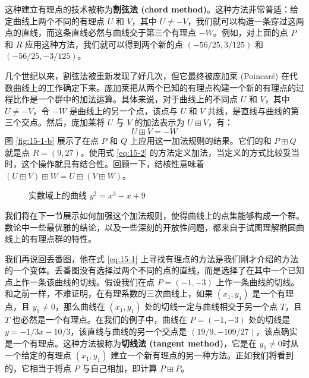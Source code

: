 这种建立有理点的技术被称为\textbf{割弦法 (chord method)}。这种方法非常普适：给定曲线上两个不同的有理点 $U$ 和 $V$，其中 $U\neq-V$，我们就可以构造一条穿过这两点的直线，而这条直线必然与曲线交于第三个有理点 $-W$。例如，对上面的点 $P$ 和 $R$ 应用这种方法，我们就可以得到两个新的点 $(-56/25,3/125)$ 和 $(-56/25,-3/125)$。

几个世纪以来，割弦法被重新发现了好几次，但它最终被庞加莱 (Poincaré) 在代数曲线上的工作确定下来。庞加莱把从两个已知的有理点构建一个新的有理点的过程比作是一个群中的加法运算。具体来说，对于曲线上的不同点 $U$ 和 $V$，其中 $U\neq-V$，令 $-W$ 是曲线上的另一个点，该点与 $U$ 和 $V$ 共线，是直线与曲线的第三个交点。然后，庞加莱将 $U$ 与 $V$ 的加法表示为 $U\boxplus V$，有：
\begin{equation}\label{eq:15-2}
U\boxplus V=-W
\end{equation}
图 \ref{fig:15-1-b} 展示了在点 $P$ 和 $Q$ 上应用这一加法规则的结果。它们的和 $P\boxplus Q$ 就是点 $R=(9,27)$。使用式 \ref{eq:15-2} 的方法定义加法，当定义的方式比较妥当时，这个操作就具有结合性。回顾一下，结核性意味着 $(U\boxplus V)\boxplus W=U\boxplus(V\boxplus W)$。


\begin{figure}
  \centering
  \subfigure[曲线]{
    
    \label{fig:15-1-a}
  }
  \quad\quad\quad\quad
  \subfigure[添加点 $P=(-1,-3)$ 和点 $Q=(1,3)$]{
    
    \label{fig:15-1-b}
  }
  \caption{实数域上的曲线 $y^2=x^3-x+9$}
  \label{fig:15-1}
\end{figure}

我们将在下一节展示如何加强这个加法规则，使得曲线上的点集能够构成一个群。数论中一些最优雅的结论，以及一些深刻的开放性问题，都来自于试图理解椭圆曲线上的有理点群的特性。

我们再说回丢番图，他在式 \ref{eq:15-1} 上寻找有理点的方法是我们刚才介绍的方法的一个变体。丢番图没有选择过两个不同的点的直线，而是选择了在其中一个已知点上作一条该曲线的切线。假设我们在点 $P=(-1,-3)$ 上作一条曲线的切线。和之前一样，不难证明，在有理系数的三次曲线上，如果 $(x_1,y_1)$ 是一个有理点，且 $y_1\neq0$，那么曲线在 $(x_1,y_1)$ 处的切线一定与曲线相交于另一个点 $T$，且 $T$ 也必然是一个有理点。在我们的例子中，曲线在 $P=(-1,-3)$ 处的切线是 $y=-{1/3}x-{10/3}$，该直线与曲线的另一个交点是 $({19/9},-{109/27})$，该点确实是一个有理点。这种方法被称为\textbf{切线法 (tangent method)}，它是在 $y_1\neq0$时从一个给定的有理点 $(x_1,y_1)$ 建立一个新有理点的另一种方法。正如我们将看到的，它相当于将点 $P$ 与自己相加，即计算 $P\boxplus P$。